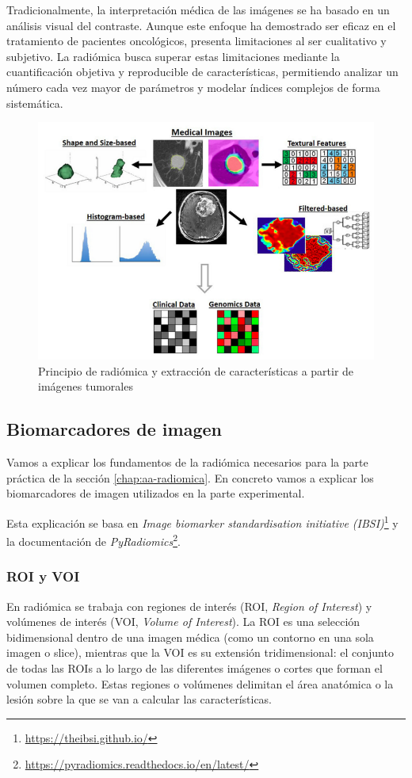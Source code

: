 Tradicionalmente, la interpretación médica de las imágenes se ha basado en un análisis visual del contraste. Aunque este enfoque ha demostrado ser eficaz en el tratamiento de pacientes oncológicos, presenta limitaciones al ser cualitativo y subjetivo. La radiómica busca superar estas limitaciones mediante la cuantificación objetiva y reproducible de características, permitiendo analizar un número cada vez mayor de parámetros y modelar índices complejos de forma sistemática.

\begin{figure}[!htbp]
    \centering
    \includegraphics[width=1\textwidth]{img/radiomica_cancer.png}
    \caption{Principio de radiómica y extracción de características a partir de imágenes tumorales \parencite{demathematical} }
    \label{fig:radiomica-cancer}
\end{figure}



\subsection{Biomarcadores de imagen}
Vamos a explicar los fundamentos de la radiómica necesarios para la parte práctica de la sección \ref{chap:aa-radiomica}. En concreto vamos a explicar los biomarcadores de imagen utilizados en la parte experimental.

Esta explicación se basa en \textit{Image biomarker standardisation initiative (IBSI)}\footnote{\url{https://theibsi.github.io/}} y la documentación de \textit{PyRadiomics}\footnote{\url{https://pyradiomics.readthedocs.io/en/latest/}}. 

\subsubsection{ROI y VOI}
En radiómica se trabaja con regiones de interés (ROI, \textit{Region of Interest}) y volúmenes de interés (VOI, \textit{Volume of Interest}). La ROI es una selección bidimensional dentro de una imagen médica (como un contorno en una sola imagen o slice), mientras que la VOI es su extensión tridimensional: el conjunto de todas las ROIs a lo largo de las diferentes imágenes o cortes que forman el volumen completo. Estas regiones o volúmenes delimitan el área anatómica o la lesión sobre la que se van a calcular las características.

